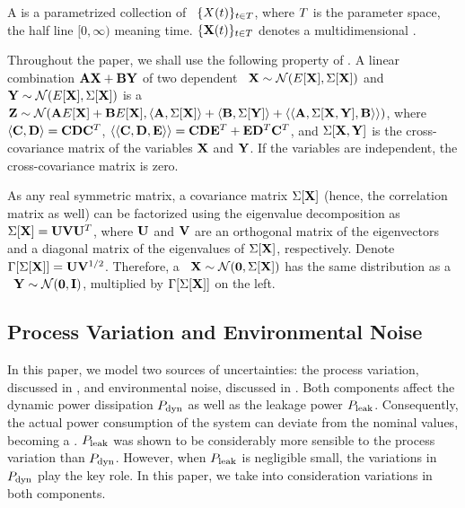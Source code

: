 A  is a parametrized collection of \rvs\ $\{ X(t) \}_{t \in T}$, where $T$ is the parameter space, the half line $[0, \infty)$ meaning time. $\{ \mathbf{X}(t) \}_{t \in T}$ denotes a multidimensional \sp.

Throughout the paper, we shall use the following property of \mnrvs. A linear combination $\mathbf{A} \mathbf{X} + \mathbf{B} \mathbf{Y}$ of two dependent \mnrvs\ $\mathbf{X} \sim \mathcal{N}(E[\mathbf{X}], \Sigma[\mathbf{X}])$ and $\mathbf{Y} \sim \mathcal{N}(E[\mathbf{X}], \Sigma[\mathbf{X}])$ is a \mnrv\ $\mathbf{Z} \sim \mathcal{N}(\mathbf{A} E[\mathbf{X}] + \mathbf{B} E[\mathbf{X}], \langle \mathbf{A}, \Sigma[\mathbf{X}] \rangle + \langle \mathbf{B}, \Sigma[\mathbf{Y}] \rangle + \langle \langle \mathbf{A}, \Sigma[\mathbf{X}, \mathbf{Y}], \mathbf{B} \rangle \rangle)$, where $\langle \mathbf{C}, \mathbf{D} \rangle = \mathbf{C} \mathbf{D} \mathbf{C}^T$, $\langle \langle \mathbf{C}, \mathbf{D}, \mathbf{E} \rangle \rangle = \mathbf{C} \mathbf{D} \mathbf{E}^T + \mathbf{E} \mathbf{D}^T \mathbf{C}^T$, and $\Sigma[\mathbf{X}, \mathbf{Y}]$ is the cross-covariance matrix of the variables $\mathbf{X}$ and $\mathbf{Y}$. If the variables are independent, the cross-covariance matrix is zero.

As any real symmetric matrix, a covariance matrix $\Sigma[\mathbf{X}]$ (hence, the correlation matrix as well) can be factorized using the eigenvalue decomposition \cite{press2007} as $\Sigma[\mathbf{X}] = \mathbf{U} \mathbf{V} \mathbf{U}^T$, where $\mathbf{U}$ and $\mathbf{V}$ are an orthogonal matrix of the eigenvectors and a diagonal matrix of the eigenvalues of $\Sigma[\mathbf{X}]$, respectively. Denote $\Gamma[\Sigma[\mathbf{X}]] = \mathbf{U} \mathbf{V}^{1/2}$. Therefore, a \mnrv\ $\mathbf{X} \sim \mathcal{N}(\mathbf{0}, \Sigma[\mathbf{X}])$ has the same distribution as a \msnrv\ $\mathbf{Y} \sim \mathcal{N}(\mathbf{0}, \mathbf{I})$, multiplied by $\Gamma[\Sigma[\mathbf{X}]]$ on the left.

\subsection{Process Variation and Environmental Noise} 
In this paper, we model two sources of uncertainties: the process variation, discussed in , and environmental noise, discussed in . Both components affect the dynamic power dissipation $P_{\text{dyn}}$ as well as the leakage power $P_{\text{leak}}$. Consequently, the actual power consumption of the system can deviate from the nominal values, becoming a \rv. $P_{\text{leak}}$ was shown to be considerably more sensible to the process variation than $P_{\text{dyn}}$. However, when $P_{\text{leak}}$ is negligible small, the variations in $P_{\text{dyn}}$ play the key role. In this paper, we take into consideration variations in both components.
